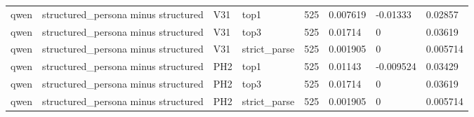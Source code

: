 \begin{tabular}{llllllll}
qwen & structured\_persona minus structured & V31 & top1 & 525 & 0.007619 & -0.01333 & 0.02857 \\
qwen & structured\_persona minus structured & V31 & top3 & 525 & 0.01714 & 0 & 0.03619 \\
qwen & structured\_persona minus structured & V31 & strict\_parse & 525 & 0.001905 & 0 & 0.005714 \\
qwen & structured\_persona minus structured & PH2 & top1 & 525 & 0.01143 & -0.009524 & 0.03429 \\
qwen & structured\_persona minus structured & PH2 & top3 & 525 & 0.01714 & 0 & 0.03619 \\
qwen & structured\_persona minus structured & PH2 & strict\_parse & 525 & 0.001905 & 0 & 0.005714 \\
\bottomrule
\end{tabular}
